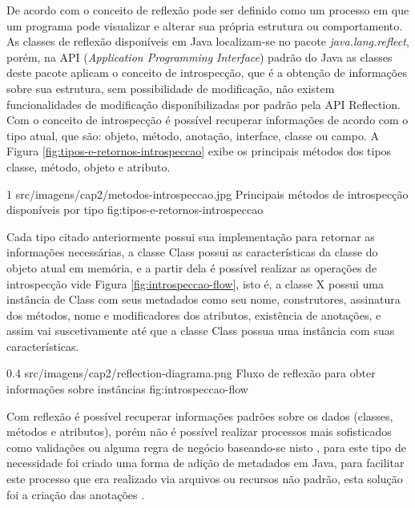 \par De acordo com  o conceito de reflexão pode ser definido como um processo em que um programa pode visualizar e alterar sua própria estrutura ou comportamento. As classes de reflexão disponíveis em Java localizam-se no pacote \textit{java.lang.reflect}, porém, na API (\textit{Application Programming Interface}) padrão do Java as classes deste pacote aplicam o conceito de introspecção, que é a obtenção de informações sobre sua estrutura, sem possibilidade de modificação, não existem funcionalidades de modificação disponibilizadas por padrão pela API Reflection. Com o conceito de introspecção é possível recuperar informações de acordo com o tipo atual, que são: objeto, método, anotação, interface, classe ou campo. A Figura \ref{fig:tipos-e-retornos-introspeccao} exibe os principais métodos dos tipos classe, método, objeto e atributo. 

\begin{image}
{1} %
{src/imagens/cap2/metodos-introspeccao.jpg} %
{Principais métodos de introspecção disponíveis por tipo} %
{fig:tipos-e-retornos-introspeccao} %
{\cite{parson2000using}} %
\end{image}

\par Cada tipo citado anteriormente possui sua implementação para retornar as informações necessárias, a classe Class possui as características da classe do objeto atual em memória, e a partir dela é possível realizar as operações de introspecção vide Figura \ref{fig:introspeccao-flow}, isto é, a classe X possui uma instância de Class com seus metadados como seu nome, construtores, assinatura dos métodos, nome e modificadores dos atributos, existência de anotações, e assim vai suscetivamente até que a classe Class possua uma instância com suas características.

\begin{image}
{0.4} %
{src/imagens/cap2/reflection-diagrama.png} %
{Fluxo de reflexão para obter informações sobre instâncias} %
{fig:introspeccao-flow} %
{} %
\end{image}
\par Com reflexão é possível recuperar informações padrões sobre os dados (classes, métodos e atributos), porém não é possível realizar processos mais sofisticados como validações ou alguma regra de negócio baseando-se nisto \cite{guerra2010architectural}, para este tipo de necessidade foi criado uma forma de adição de metadados em Java, para facilitar este processo que era realizado via arquivos ou recursos não padrão, esta solução foi a criação das anotações .

